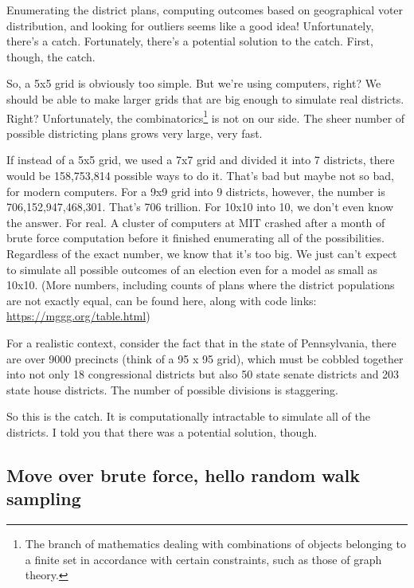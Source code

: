 \documentclass[
  openany]{book}
\begin{document}
Enumerating the district plans, computing outcomes based on geographical voter distribution, and looking for outliers seems like a good idea! Unfortunately, there's a catch. Fortunately, there's a potential solution to the catch. First, though, the catch.

So, a 5x5 grid is obviously too simple. But we're using computers, right? We should be able to make larger grids that are big enough to simulate real districts. Right? Unfortunately, the combinatorics\footnote{The branch of mathematics dealing with combinations of objects belonging to a finite set in accordance with certain constraints, such as those of graph theory.} is not on our side. The sheer number of possible districting plans grows very large, very fast.

If instead of a 5x5 grid, we used a 7x7 grid and divided it into 7 districts, there would be 158,753,814 possible ways to do it. That's bad but maybe not so bad, for modern computers. For a 9x9 grid into 9 districts, however, the number is 706,152,947,468,301. That's 706 trillion. For 10x10 into 10, we don't even know the answer. For real. A cluster of computers at MIT crashed after a month of brute force computation before it finished enumerating all of the possibilities. Regardless of the exact number, we know that it's too big. We just can't expect to simulate all possible outcomes of an election even for a model as small as 10x10. (More numbers, including counts of plans where the district populations are not exactly equal, can be found here, along with code links: \url{https://mggg.org/table.html})

For a realistic context, consider the fact that in the state of Pennsylvania, there are over 9000 precincts (think of a 95 x 95 grid), which must be cobbled together into not only 18 congressional districts but also 50 state senate districts and 203 state house districts. The number of possible divisions is staggering.

So this is the catch. It is computationally intractable to simulate all of the districts. I told you that there was a potential solution, though.

\hypertarget{move-over-brute-force-hello-random-walk-sampling}{%
\subsection*{Move over brute force, hello random walk sampling}\label{move-over-brute-force-hello-random-walk-sampling}}
\end{document}
